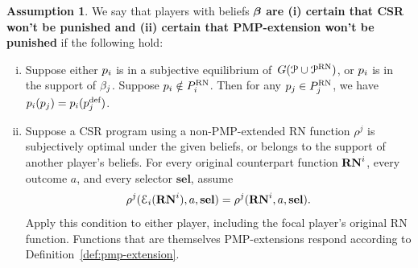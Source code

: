 \documentclass[sigconf]{aamas}
\newcommand{\allprogreneg}{\allprog^{\text{RN}}}
\newcommand{\selection}{sel}%
\newcommand{\renegb}{\mathbf{\selection}}
\theoremstyle{definition}
\newtheorem{assumption}[definition]{Assumption}
\begin{document}
\begin{assumption}
     We say that 
     players 
     with beliefs $\boldsymbol{\beta}$ 
     \textbf{are (i) certain that CSR won't be punished and (ii) certain that PMP-extension won't be punished} 
     if the following hold:
     \begin{enumerate}[(i)]
      \item Suppose either $p_i$ is in a subjective equilibrium
     of~$\game(\allprog \cup \allprogreneg)$,
     or $p_i$ is in the support of $\beta_j$.
      Suppose $p_i \notin P_i^{\textnormal{RN}}$. 
         Then for any $p_j \in  P_j^{\textnormal{RN}}$,
         we have 
         $p_i(p_j) = p_i(p_j^{\textnormal{def}})$.
         \label{subassum:csrwlog}
         \item Suppose a CSR program using a non-PMP-extended RN
     function $\rho^j$ is subjectively optimal under the given beliefs,
     or belongs to the support of another player's beliefs.
     For every original counterpart function $\mathbf{RN}^{i}$, every outcome
     $a$, and every selector $\renegb$, assume
     \[
       \rho^j(\mathcal E_i(\renegi),a,\renegb)
          =\rho^j(\renegi,a,\renegb).
     \]
     Apply this condition to either player, including the focal
     player's original RN function. Functions that are themselves
     PMP-extensions respond according to Definition~\ref{def:pmp-extension}.
     \label{subassum:extension}
     \end{enumerate}
     
      \label{assum:nopunish}
\end{assumption}  %
\end{document}
